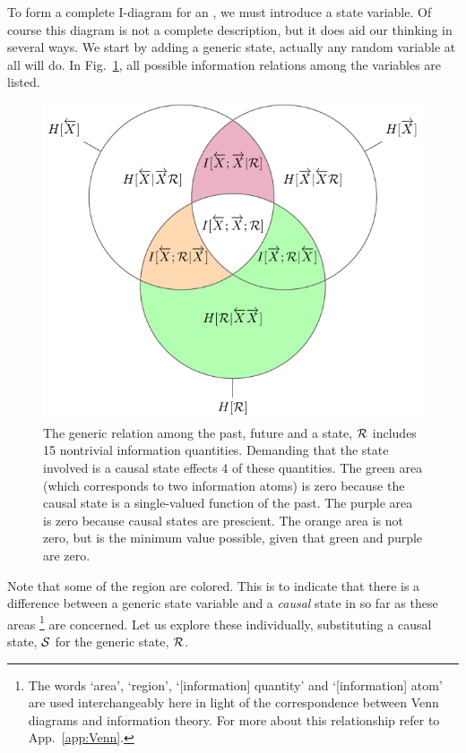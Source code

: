 To form a complete I-diagram for an \eM, we must introduce a state variable. Of course this diagram is not a complete description, but it does aid our thinking in several ways. We start by adding a generic state, actually any random variable at all will do. In Fig.~\ref{fig:3var_PastFutureRcolored}, all possible information relations among the variables are listed.
\begin{figure}[h!]
\centering
\includegraphics{../chapter1/figures/tikz/3var_PastFutureRcolored}
\caption{The generic relation among the past, future and a state, $\mathcal{R}$ includes 15 nontrivial information quantities. Demanding that the state involved is a causal state effects 4 of these quantities. The green area (which corresponds to two information atoms) is zero because the causal state is a single-valued function of the past. The purple area is zero because causal states are prescient. The orange area is not zero, but is the minimum value possible, given that green and purple are zero.}
\label{fig:3var_PastFutureRcolored}
\end{figure}

Note that some of the region are colored. This is to indicate that there is a difference between a generic state variable and a \emph{causal} state in so far as these areas \footnote{The words `area', `region', `[information] quantity' and `[information] atom' are used interchangeably here in light of the correspondence between Venn diagrams and information theory. For more about this relationship refer to App.~\ref{app:Venn}.} are concerned. Let us explore these individually, substituting a causal state, $\mathcal{S}$ for the generic state, $\mathcal{R}$.

